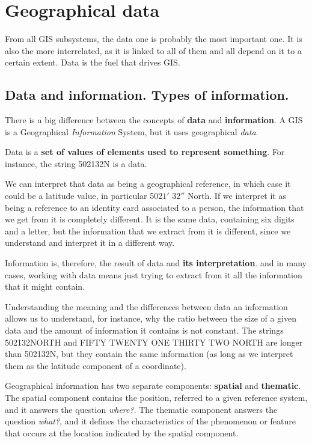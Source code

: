 

\chapter{Geographical data}

\pagestyle{fancy}

From all GIS subsystems, the data one is probably the most important one. It is also the more interrelated, as it is linked to all of them and all depend on it to a certain extent. Data is the fuel that drives GIS. 

\section{Data and information. Types of information.}

There is a big difference between the concepts of \textbf{data} and \textbf{information}. A GIS is a Geographical \emph{Information} System, but it uses geographical \emph{data}.

Data is a \textbf{set of values of elements used to represent something}. For instance, the string 502132N is a data.

We can interpret that data as being a geographical reference, in which case it could be a latitude value, in particular 50\degree $21'$ $32''$ North. If we interpret it as being a reference to an identity card associated to a person, the information that we get from it is completely different. It is the same data, containing six digits and a letter, but the information that we extract from it is different, since we understand and interpret it in a different way.

Information is, therefore, the result of data and \textbf{its interpretation}. and in many cases, working with data means just trying to extract from it all the information that it might contain.

Understanding the meaning and the differences between data an information allows us to understand, for instance, why the ratio between the size of a given data and the amount of information it contains is not constant. The strings 502132NORTH and FIFTY TWENTY ONE THIRTY TWO NORTH are longer than 502132N, but they contain the same information (as long as we interpret them as the latitude component of a coordinate).

Geographical information has two separate components: \textbf{spatial} and \textbf{thematic}. The spatial component contains the position, referred to a given reference system, and it answers the question \emph{where?}. The thematic component answers the question \emph{what?}, and it defines the characteristics of the phenomenon or feature that occurs at the location indicated by the spatial component.

